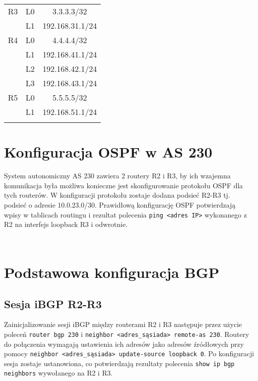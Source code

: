 \documentclass[a4paper,12pt,notitlepage]{article}
\begin{document}
\begin{table}[htbp]
{\begin{tabular}{|*3c|}
        \hline
            R3 & L0 & 3.3.3.3/32      \\
               & L1 & 192.168.31.1/24 \\
        \hline
            R4 & L0 & 4.4.4.4/32      \\
               & L1 & 192.168.41.1/24 \\
               & L2 & 192.168.42.1/24 \\
               & L3 & 192.168.43.1/24 \\
        \hline
            R5 & L0 & 5.5.5.5/32      \\
               & L1 & 192.168.51.1/24 \\
        \hhline{|===|}
    \end{tabular}}
\end{table}

\section{Konfiguracja OSPF w AS 230}
System autonomiczny AS 230 zawiera 2 routery R2 i R3, by ich wzajemna komunikacja była możliwa konieczne jest skonfigurowanie protokołu OSPF dla tych routerów. W konfiguracji protokołu zostaje dodana podsieć R2-R3 tj. podsieć o adresie 10.0.23.0/30. Prawidłową konfigurację OSPF potwierdzają wpisy w tablicach routingu i rezultat polecenia  \texttt{ping <adres IP>} wykonanego z R2 na interfejs loopback R3 i odwrotnie.
\inputminted[label=Pingowanie interfejsu loopback R3 z R2, firstline=178, lastline=183]{text}{Routers/R2.txt}
\inputminted[label=Pingowanie interfejsu loopback R2 z R3, firstline=306, lastline=311]{text}{Routers/R3.txt}
\section{Podstawowa konfiguracja BGP}
\subsection{Sesja iBGP R2-R3}
Zainicjalizowanie sesji iBGP między routerami R2 i R3 następuje przez użycie poleceń  \texttt{router bgp 230} i  \texttt{neighbor <adres_sąsiada> remote-as 230}. Routery do połączenia wymagają ustawienia ich adresów jako adresów źródłowych przy pomocy  \texttt{neighbor <adres_sąsiada> update-source loopback 0}. Po konfiguracji sesja zostaje ustanowiona, co potwierdzają rezultaty polecenia  \texttt{show ip bgp neighbors} wywołanego na R2 i R3.
\inputminted[label=Stan sesji BGP po ustawieniu adresów źródłowych na R2, firstline=242, lastline=244]{text}{Routers/R2.txt}
\inputminted[label=Stan sesji BGP po ustawieniu adresów źródłowych na R3, firstline=439, lastline=441]{text}{Routers/R3.txt}
\end{document}
